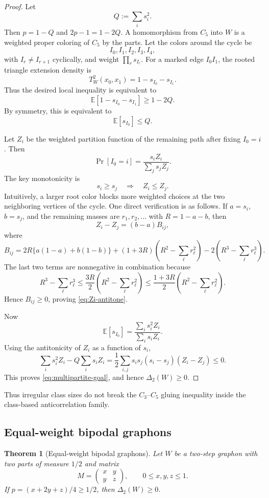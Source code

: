 \documentclass[11pt]{article}
\newtheorem{theorem}{Theorem}[section]
\theoremstyle{definition}
\newcommand{\E}{\mathbb E}
\begin{document}
\begin{proof}
Let
\[
  Q:=\sum_i s_i^2.
\]
Then $p=1-Q$ and $2p-1=1-2Q$.  A homomorphism from $C_5$ into $W$ is a weighted proper coloring of $C_5$ by the parts.  Let the colors around the cycle be
\[
  I_0,I_1,I_2,I_3,I_4,
\]
with $I_r\ne I_{r+1}$ cyclically, and weight $\prod_r s_{I_r}$.  For a marked edge $I_0I_1$, the rooted triangle extension density is
\[
  T_W^2(x_0,x_1)=1-s_{I_0}-s_{I_1}.
\]
Thus the desired local inequality is equivalent to
\[
  \E[1-s_{I_0}-s_{I_1}]\ge 1-2Q.
\]
By symmetry, this is equivalent to
\begin{equation}\label{eq:multipartite-goal}
  \E[s_{I_0}]\le Q.
\end{equation}

Let $Z_i$ be the weighted partition function of the remaining path after fixing $I_0=i$.  Then
\[
  \Pr[I_0=i]=\frac{s_iZ_i}{\sum_j s_jZ_j}.
\]
The key monotonicity is
\begin{equation}\label{eq:Zi-antitone}
  s_i\ge s_j\quad\Longrightarrow\quad Z_i\le Z_j.
\end{equation}
Intuitively, a larger root color blocks more weighted choices at the two neighboring vertices of the cycle.  One direct verification is as follows.  If $a=s_i$, $b=s_j$, and the remaining masses are $r_1,r_2,\dots$ with $R=1-a-b$, then
\[
  Z_i-Z_j=(b-a)B_{ij},
\]
where
\[
  B_{ij}=2R\{a(1-a)+b(1-b)\}
  +(1+3R)\left(R^2-\sum_\ell r_\ell^2\right)
  -2\left(R^3-\sum_\ell r_\ell^3\right).
\]
The last two terms are nonnegative in combination because
\[
  R^3-\sum_\ell r_\ell^3
  \le \frac{3R}{2}\left(R^2-\sum_\ell r_\ell^2\right)
  \le \frac{1+3R}{2}\left(R^2-\sum_\ell r_\ell^2\right).
\]
Hence $B_{ij}\ge0$, proving \eqref{eq:Zi-antitone}.

Now
\[
  \E[s_{I_0}]=\frac{\sum_i s_i^2Z_i}{\sum_i s_iZ_i}.
\]
Using the antitonicity of $Z_i$ as a function of $s_i$,
\[
  \sum_i s_i^2Z_i-Q\sum_i s_iZ_i
  =\frac12\sum_{i,j}s_is_j(s_i-s_j)(Z_i-Z_j)\le0.
\]
This proves \eqref{eq:multipartite-goal}, and hence $\Delta_2(W)\ge0$.
\end{proof}

Thus irregular class sizes do not break the $C_3$--$C_5$ gluing inequality inside the class-based anticorrelation family.

\subsection{Equal-weight bipodal graphons}

\begin{theorem}[Equal-weight bipodal graphons]\label{thm:bipodal-SG2}
Let $W$ be a two-step graphon with two parts of measure $1/2$ and matrix
\[
  M=\begin{pmatrix}x&y\\ y&z\end{pmatrix},
  \qquad 0\le x,y,z\le1.
\]
If $p=(x+2y+z)/4\ge1/2$, then $\Delta_2(W)\ge0$.
\end{theorem}
\end{document}
